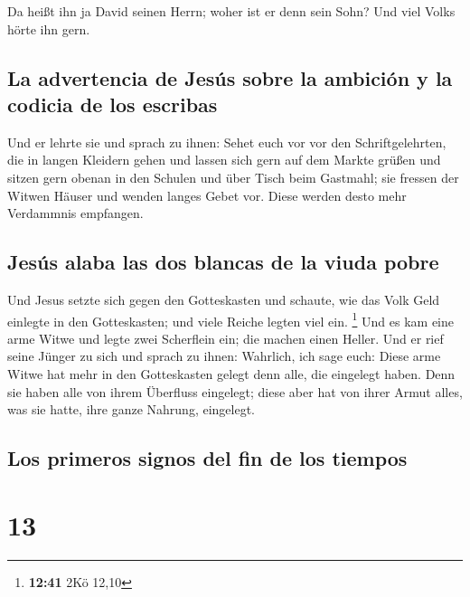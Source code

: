  Da heißt ihn ja David seinen Herrn; woher ist er denn
sein Sohn? Und viel Volks hörte ihn gern.

\hypertarget{la-advertencia-de-jesuxfas-sobre-la-ambiciuxf3n-y-la-codicia-de-los-escribas}{%
\subsection{La advertencia de Jesús sobre la ambición y la codicia de
los
escribas}\label{la-advertencia-de-jesuxfas-sobre-la-ambiciuxf3n-y-la-codicia-de-los-escribas}}

 Und er lehrte sie und sprach zu ihnen: Sehet euch vor
vor den Schriftgelehrten, die in langen Kleidern gehen und lassen sich
gern auf dem Markte grüßen  und sitzen gern obenan in den
Schulen und über Tisch beim Gastmahl;  sie fressen der
Witwen Häuser und wenden langes Gebet vor. Diese werden desto mehr
Verdammnis empfangen.

\hypertarget{jesuxfas-alaba-las-dos-blancas-de-la-viuda-pobre}{%
\subsection{Jesús alaba las dos blancas de la viuda
pobre}\label{jesuxfas-alaba-las-dos-blancas-de-la-viuda-pobre}}

 Und Jesus setzte sich gegen den Gotteskasten und
schaute, wie das Volk Geld einlegte in den Gotteskasten; und viele
Reiche legten viel ein. \footnote{\textbf{12:41} 2Kö 12,10}
 Und es kam eine arme Witwe und legte zwei Scherflein
ein; die machen einen Heller.  Und er rief seine Jünger
zu sich und sprach zu ihnen: Wahrlich, ich sage euch: Diese arme Witwe
hat mehr in den Gotteskasten gelegt denn alle, die eingelegt haben.
 Denn sie haben alle von ihrem Überfluss eingelegt; diese
aber hat von ihrer Armut alles, was sie hatte, ihre ganze Nahrung,
eingelegt.

\hypertarget{los-primeros-signos-del-fin-de-los-tiempos}{%
\subsection{Los primeros signos del fin de los
tiempos}\label{los-primeros-signos-del-fin-de-los-tiempos}}

\hypertarget{section-12}{%
\section{13}\label{section-12}}

